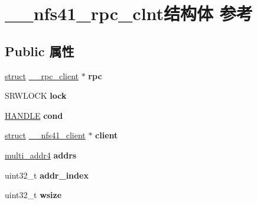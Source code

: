 \hypertarget{struct____nfs41__rpc__clnt}{}\section{\+\_\+\+\_\+nfs41\+\_\+rpc\+\_\+clnt结构体 参考}
\label{struct____nfs41__rpc__clnt}
\subsection*{Public 属性}
\begin{DoxyCompactItemize}
\item 
\mbox{\label{struct____nfs41__rpc__clnt_a1fed9ce2ee72ea471d4fd773230019ea}} 
\hyperlink{interfacestruct}{struct} \hyperlink{struct____rpc__client}{\+\_\+\+\_\+rpc\+\_\+client} $\ast$ {\bfseries rpc}
\item 
\mbox{\label{struct____nfs41__rpc__clnt_a2335cc9accb74484168cd16713205da9}} 
S\+R\+W\+L\+O\+CK {\bfseries lock}
\item 
\mbox{\label{struct____nfs41__rpc__clnt_a3a114fdf00603e6247f6fe78ecc1a1b4}} 
\hyperlink{interfacevoid}{H\+A\+N\+D\+LE} {\bfseries cond}
\item 
\mbox{\label{struct____nfs41__rpc__clnt_a74313d1775d4415a792973b2e057cf25}} 
\hyperlink{interfacestruct}{struct} \hyperlink{struct____nfs41__client}{\+\_\+\+\_\+nfs41\+\_\+client} $\ast$ {\bfseries client}
\item 
\mbox{\label{struct____nfs41__rpc__clnt_a225aef8c60ea5429fba3064611e48b2f}} 
\hyperlink{struct____multi__addr4}{multi\+\_\+addr4} {\bfseries addrs}
\item 
\mbox{\label{struct____nfs41__rpc__clnt_a23a57ae374947241955c76ae777c98ee}} 
uint32\+\_\+t {\bfseries addr\+\_\+index}
\item 
\mbox{\label{struct____nfs41__rpc__clnt_a687ee62dde575fdce4eceebca5f0ad72}} 
uint32\+\_\+t {\bfseries wsize}
\item 
\mbox{\label{struct____nfs41__rpc__clnt_a5a27b4dfaeab85da41d1a72198a948e4}} 

\end{DoxyCompactItemize}
